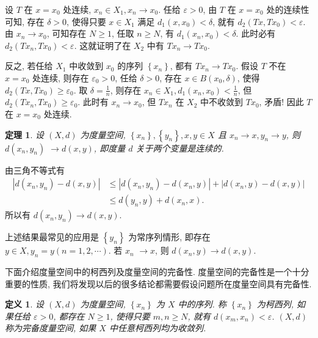\documentclass[openany]{ctexbook}
\makeatletter
\theoremstyle{kaiti}
\newtheorem{definition}{定义}[section]
\newtheorem{theorem}{定理}[section]
\theoremstyle{normal}
\renewenvironment{proof}[1][\proofname]{\par
    \pushQED{\qed}%
    \normalfont \topsep6\p@\@plus6\p@\relax
    \trivlist
    \item\relax
    {\heiti #1}\hspace{2\labelsep}\ignorespaces
  }{%
    \popQED\endtrivlist\@endpefalse
  }
\makeatother
\begin{document}
\begin{proof}
设 $T$ 在 $x=x_0$ 处连续, $x_n \in X_1, x_n \rightarrow x_0$. 任给 $\varepsilon>0$, 由 $T$ 在 $x=x_0$ 处的连续性可知, 存在 $\delta>0$, 使得只要 $x \in X_1$ 满足 $d_1\left(x, x_0\right)<\delta$, 就有 $d_2\left(T x, T x_0\right)<\varepsilon$. 由 $x_n \rightarrow x_0$, 可知存在 $N \geqslant 1$, 任取 $n \geqslant N$, 有 $d_1\left(x_n, x_0\right)<\delta$. 此时必有 $d_2\left(T x_n, T x_0\right)<\varepsilon$. 这就证明了在 $X_2$ 中有 $T x_n \rightarrow T x_0$.

反之, 若任给 $X_1$ 中收敛到 $x_0$ 的序列 $\left\{x_n\right\}$, 都有 $T x_n \rightarrow T x_0$. 假设 $T$ 不在 $x=x_0$ 处连续, 则存在 $\varepsilon_0>0$, 任给 $\delta>0$, 存在 $x \in B\left(x_0, \delta\right)$, 使得 $d_2\left(T x, T x_0\right) \geqslant \varepsilon_0$. 取 $\delta=\frac{1}{n}$, 则存在 $x_n \in X_1, d_1\left(x_n, x_0\right)<\frac{1}{n}$, 但 $d_2\left(T x_n, T x_0\right) \geqslant \varepsilon_0$. 此时有 $x_n \rightarrow x_0$, 但 $T x_n$ 在 $X_2$ 中不收敛到 $T x_0$, 矛盾! 因此 $T$ 在 $x=x_0$ 处连续.
\end{proof}

\begin{theorem}
  设 $(X, d)$ 为度量空间, $\left\{x_n\right\},\left\{y_n\right\}, x, y \in X$ 且 $x_n \rightarrow x, y_n \rightarrow y$, 则 $d\left(x_n, y_n\right)$ $\rightarrow d(x, y)$, 即度量 $d$ 关于两个变量是连续的.
\end{theorem}

\begin{proof}
由三角不等式有
$$
\begin{aligned}
\left|d\left(x_n, y_n\right)-d(x, y)\right| & \leqslant\left|d\left(x_n, y_n\right)-d\left(x_n, y\right)\right|+\left|d\left(x_n, y\right)-d(x, y)\right| \\
& \leqslant d\left(y_n, y\right)+d\left(x_n, x\right).
\end{aligned}
$$
所以有 $d\left(x_n, y_n\right) \rightarrow d(x, y)$.
\end{proof}

上述结果最常见的应用是 $\left\{y_n\right\}$ 为常序列情形, 即存在 $y \in X, y_n=y(n=1,2, \cdots)$. 若 $x_n$ $\rightarrow x$, 则 $d\left(x_n, y\right) \rightarrow d(x, y)$.

下面介绍度量空间中的柯西列及度量空间的完备性. 度量空间的完备性是一个十分重要的性质, 我们将发现以后的很多结论都需要假设问题所在度量空间具有完备性.

\begin{definition}
  设 $(X, d)$ 为度量空间, $\left\{x_n\right\}$ 为 $X$ 中的序列. 称 $\left\{x_n\right\}$ 为柯西列, 如果任给 $\varepsilon>0$, 都存在 $N \geqslant 1$, 使得只要 $m, n \geqslant N$, 就有 $d\left(x_m, x_n\right)<\varepsilon$. $(X, d)$ 称为完备度量空间, 如果 $X$ 中任意柯西列均为收敛列.
\end{definition}
\end{document}
